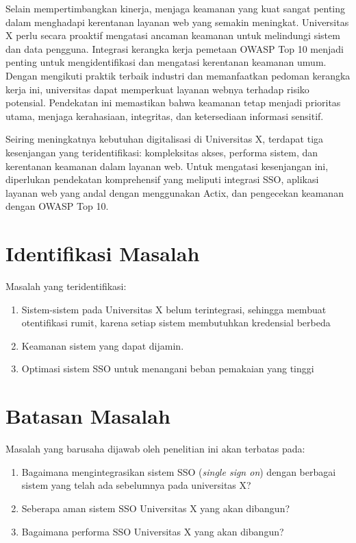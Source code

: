 \documentclass{article}
\begin{document}
Selain mempertimbangkan kinerja, menjaga keamanan yang kuat sangat penting dalam menghadapi kerentanan layanan web yang semakin meningkat. Universitas X perlu secara proaktif mengatasi ancaman keamanan untuk melindungi sistem dan data pengguna. Integrasi kerangka kerja pemetaan OWASP Top 10 menjadi penting untuk mengidentifikasi dan mengatasi kerentanan keamanan umum. Dengan mengikuti praktik terbaik industri dan memanfaatkan pedoman kerangka kerja ini, universitas dapat memperkuat layanan webnya terhadap risiko potensial. Pendekatan ini memastikan bahwa keamanan tetap menjadi prioritas utama, menjaga kerahasiaan, integritas, dan ketersediaan informasi sensitif.

Seiring meningkatnya kebutuhan digitalisasi di Universitas X, terdapat tiga kesenjangan yang teridentifikasi: kompleksitas akses, performa sistem, dan kerentanan keamanan dalam layanan web. Untuk mengatasi kesenjangan ini, diperlukan pendekatan komprehensif yang meliputi integrasi SSO, aplikasi layanan web yang andal dengan menggunakan Actix, dan pengecekan keamanan dengan OWASP Top 10.


\section{Identifikasi Masalah}
Masalah yang teridentifikasi:
\begin{enumerate}
    \item Sistem-sistem pada Universitas X belum terintegrasi, sehingga membuat otentifikasi rumit, karena setiap sistem membutuhkan kredensial berbeda
    \item Keamanan sistem yang dapat dijamin.
    \item Optimasi sistem SSO untuk menangani beban pemakaian yang tinggi
\end{enumerate}
\section{Batasan Masalah}
Masalah yang barusaha dijawab oleh penelitian ini akan terbatas pada:
\begin{enumerate}
    \item Bagaimana mengintegrasikan sistem SSO (\emph{single sign on}) dengan berbagai sistem yang telah ada sebelumnya pada universitas X?
    \item Seberapa aman sistem SSO Universitas X yang akan dibangun?
    \item Bagaimana performa SSO Universitas X yang akan dibangun?
\end{enumerate}
\end{document}
